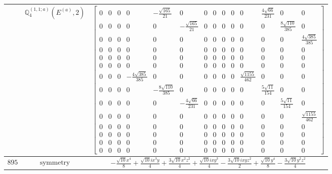 \documentclass[fleqn,8pt,landscape]{jsarticle}
\begin{document}
\begin{longtable}{ccc}
$  $ & $ \mathbb{Q}_{4}^{(1,1;a)}(E^{(a)},2) $ & $ \begin{bmatrix} 0 & 0 & 0 & 0 & - \frac{\sqrt{165}}{21} & 0 & 0 & 0 & 0 & 0 & 0 & \frac{4 \sqrt{66}}{231} & 0 & 0 \\ 0 & 0 & 0 & 0 & 0 & - \frac{\sqrt{165}}{21} & 0 & 0 & 0 & 0 & 0 & 0 & \frac{8 \sqrt{110}}{385} & 0 \\ 0 & 0 & 0 & 0 & 0 & 0 & 0 & 0 & 0 & 0 & 0 & 0 & 0 & \frac{4 \sqrt{385}}{385} \\ 0 & 0 & 0 & 0 & 0 & 0 & 0 & 0 & 0 & 0 & 0 & 0 & 0 & 0 \\ 0 & 0 & 0 & 0 & 0 & 0 & 0 & 0 & 0 & 0 & 0 & 0 & 0 & 0 \\ 0 & 0 & 0 & 0 & 0 & 0 & 0 & 0 & 0 & 0 & 0 & 0 & 0 & 0 \\ 0 & 0 & 0 & - \frac{4 \sqrt{385}}{385} & 0 & 0 & 0 & 0 & 0 & 0 & \frac{\sqrt{1155}}{462} & 0 & 0 & 0 \\ 0 & 0 & 0 & 0 & - \frac{8 \sqrt{110}}{385} & 0 & 0 & 0 & 0 & 0 & 0 & \frac{5 \sqrt{11}}{154} & 0 & 0 \\ 0 & 0 & 0 & 0 & 0 & - \frac{4 \sqrt{66}}{231} & 0 & 0 & 0 & 0 & 0 & 0 & \frac{5 \sqrt{11}}{154} & 0 \\ 0 & 0 & 0 & 0 & 0 & 0 & 0 & 0 & 0 & 0 & 0 & 0 & 0 & \frac{\sqrt{1155}}{462} \\ 0 & 0 & 0 & 0 & 0 & 0 & 0 & 0 & 0 & 0 & 0 & 0 & 0 & 0 \\ 0 & 0 & 0 & 0 & 0 & 0 & 0 & 0 & 0 & 0 & 0 & 0 & 0 & 0 \\ 0 & 0 & 0 & 0 & 0 & 0 & 0 & 0 & 0 & 0 & 0 & 0 & 0 & 0 \\ 0 & 0 & 0 & 0 & 0 & 0 & 0 & 0 & 0 & 0 & 0 & 0 & 0 & 0 \end{bmatrix} $ \\ \hline
$ 895 $ & $ \text{symmetry} $ & $ - \frac{\sqrt{10} x^{4}}{8} + \frac{\sqrt{10} i x^{3} y}{4} + \frac{3 \sqrt{10} x^{2} z^{2}}{4} + \frac{\sqrt{10} i x y^{3}}{4} - \frac{3 \sqrt{10} i x y z^{2}}{2} + \frac{\sqrt{10} y^{4}}{8} - \frac{3 \sqrt{10} y^{2} z^{2}}{4} $ \\

\end{longtable}
\end{document}
